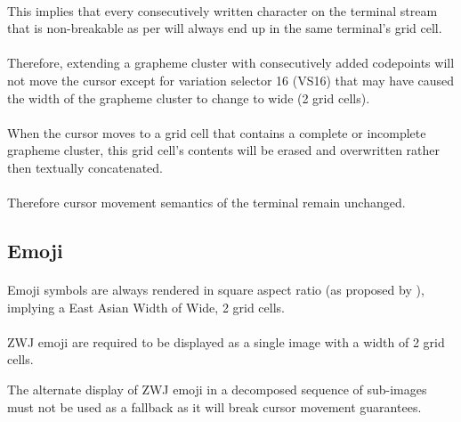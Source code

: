 \documentclass{article}
\begin{document}
\paragraph*{}
This implies that every consecutively written character on the terminal
stream that is non-breakable as per \cite{UTS-29} will
always end up in the same terminal's grid cell.

\paragraph*{}
Therefore, extending a grapheme cluster with consecutively added codepoints
will not move the cursor except for variation selector 16 (VS16) that may
have caused the width of the grapheme cluster to change to wide (2 grid cells).

\paragraph*{}
When the cursor moves to a grid cell that contains a complete or incomplete
grapheme cluster, this grid cell's contents will be erased and overwritten
rather then textually concatenated.

\paragraph*{}
Therefore cursor movement semantics of the terminal remain unchanged.

\subsection{Emoji}

\paragraph*{}
Emoji symbols are always rendered in square aspect ratio
(as proposed by \cite{UTS-51}),
implying a East Asian Width \cite{UTS-11} of Wide, 2 grid cells.

\paragraph*{}
ZWJ emoji are required to be displayed as a single image with a width of 2 grid cells.

The alternate display of ZWJ emoji in a decomposed sequence of sub-images
must not be used as a fallback as it will break cursor movement guarantees.
\end{document}
